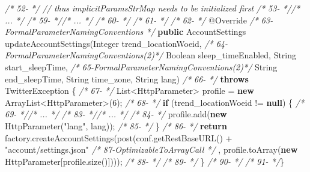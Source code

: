 \documentclass[
]{article}
\newenvironment{Shaded}{\begin{snugshade}}{\end{snugshade}}
\newcommand{\AttributeTok}[1]{\textcolor[rgb]{0.77,0.63,0.00}{#1}}
\newcommand{\BuiltInTok}[1]{#1}
\newcommand{\CommentTok}[1]{\textcolor[rgb]{0.56,0.35,0.01}{\textit{#1}}}
\newcommand{\DecValTok}[1]{\textcolor[rgb]{0.00,0.00,0.81}{#1}}
\newcommand{\FunctionTok}[1]{\textcolor[rgb]{0.00,0.00,0.00}{#1}}
\newcommand{\KeywordTok}[1]{\textcolor[rgb]{0.13,0.29,0.53}{\textbf{#1}}}
\newcommand{\NormalTok}[1]{#1}
\newcommand{\StringTok}[1]{\textcolor[rgb]{0.31,0.60,0.02}{#1}}
\begin{document}
\begin{landscape}
\begin{Shaded}
\begin{Highlighting}[]
\CommentTok{/* 52-                                   */}            \CommentTok{// thus implicitParamsStrMap needs to be initialized first}
\CommentTok{/* 53-                                   *//* ...  */}
\CommentTok{/* 59-                                   *//* ...  */}
\CommentTok{/* 60-                                   */}
\CommentTok{/* 61-                                   */}    
\CommentTok{/* 62-                                   */}    \AttributeTok{@Override}
\CommentTok{/* 63-FormalParameterNamingConventions   */}    \KeywordTok{public}\NormalTok{ AccountSettings }\FunctionTok{updateAccountSettings}\NormalTok{(}\BuiltInTok{Integer}\NormalTok{ trend_locationWoeid,}
\CommentTok{/* 64-FormalParameterNamingConventions(2)*/}                                                 \BuiltInTok{Boolean}\NormalTok{ sleep_timeEnabled, }\BuiltInTok{String}\NormalTok{ start_sleepTime,}
\CommentTok{/* 65-FormalParameterNamingConventions(2)*/}                                                 \BuiltInTok{String}\NormalTok{ end_sleepTime, }\BuiltInTok{String}\NormalTok{ time_zone, }\BuiltInTok{String}\NormalTok{ lang)}
\CommentTok{/* 66-                                   */}            \KeywordTok{throws}\NormalTok{ TwitterException \{}
\CommentTok{/* 67-                                   */}        \BuiltInTok{List}\NormalTok{<HttpParameter> profile = }\KeywordTok{new} \BuiltInTok{ArrayList}\NormalTok{<HttpParameter>(}\DecValTok{6}\NormalTok{);}
\CommentTok{/* 68-                                   */}        \KeywordTok{if}\NormalTok{ (trend_locationWoeid != }\KeywordTok{null}\NormalTok{) \{}
\CommentTok{/* 69-                                   *//* ...  */}
\CommentTok{/* 83-                                   *//* ...  */}
\CommentTok{/* 84-                                   */}\NormalTok{            profile.}\FunctionTok{add}\NormalTok{(}\KeywordTok{new} \FunctionTok{HttpParameter}\NormalTok{(}\StringTok{"lang"}\NormalTok{, lang));}
\CommentTok{/* 85-                                   */}\NormalTok{        \}}
\CommentTok{/* 86-                                   */}        \KeywordTok{return}\NormalTok{ factory.}\FunctionTok{createAccountSettings}\NormalTok{(}\FunctionTok{post}\NormalTok{(conf.}\FunctionTok{getRestBaseURL}\NormalTok{() + }\StringTok{"account/settings.json"}
\CommentTok{/* 87-OptimizableToArrayCall             */}\NormalTok{                , profile.}\FunctionTok{toArray}\NormalTok{(}\KeywordTok{new}\NormalTok{ HttpParameter[profile.}\FunctionTok{size}\NormalTok{()])));}
\CommentTok{/* 88-                                   */}
\CommentTok{/* 89-                                   */}\NormalTok{    \}}
\CommentTok{/* 90-                                   */}
\CommentTok{/* 91-                                   */}\NormalTok{\}}
\end{Highlighting}
\end{Shaded}


\end{landscape}
\end{document}
